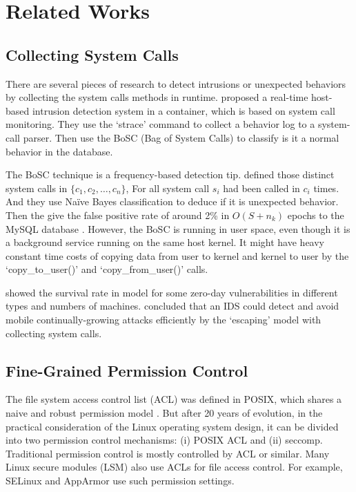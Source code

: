 \section{Related Works}

\subsection{Collecting System Calls}
There are several pieces of research to detect intrusions or unexpected behaviors
by collecting the system calls methods in runtime.
\textcite{10.1007/978-3-319-24858-5_8} proposed a real-time host-based intrusion
detection system in a container, which is based on system call monitoring. They use
the `strace' command to collect a behavior log to a system-call parser. Then use the
BoSC (Bag of System Calls) \cite{1495942} to classify is it a normal behavior in
the database.

The BoSC technique is a frequency-based detection tip. \textcite{1495942} defined
those distinct system calls in $\{c_1, c_2, \dots, c_n \}$, For all system call $s_i$
had been called in $c_i$ times. And they use Na\"ive Bayes classification to deduce if
it is unexpected behavior. Then the \citeauthor{10.1007/978-3-319-24858-5_8} give the false positive rate
of around 2\% in $O(S+n_k)$ epochs to the MySQL database \cite{10.1007/978-3-319-24858-5_8}.
However, the BoSC is running in user space, even though it is a background service running
on the same host kernel. It might have heavy constant time costs of copying data from
user to kernel and kernel to user by the `copy\_to\_user()' and `copy\_from\_user()' calls.

\textcite{7809699,7796855} showed the survival rate in \textcite{10.1007/978-3-319-24858-5_8}
model for some zero-day vulnerabilities in different types and numbers of machines.
\textcite{7809699,7796855} concluded that an IDS could detect and avoid mobile continually-growing
attacks efficiently by the `escaping' model with collecting system calls.

\subsection{Fine-Grained Permission Control}

The file system access control list (ACL) was defined in POSIX, which shares a naive and robust
permission model \cite{Grnbacher2003POSIXAC, 10.5555/3026877.3026930}. But after 20 years of
evolution, in the practical consideration of the Linux operating system design, it can be divided
into two permission control mechanisms: (\Rn{1}) POSIX ACL and (\Rn{2}) seccomp. Traditional
permission control is mostly controlled by ACL or similar. Many Linux secure modules (LSM) also
use ACLs for file access control\cite{Smalley2003ImplementingSA}. For example, SELinux and AppArmor
use such permission settings.

